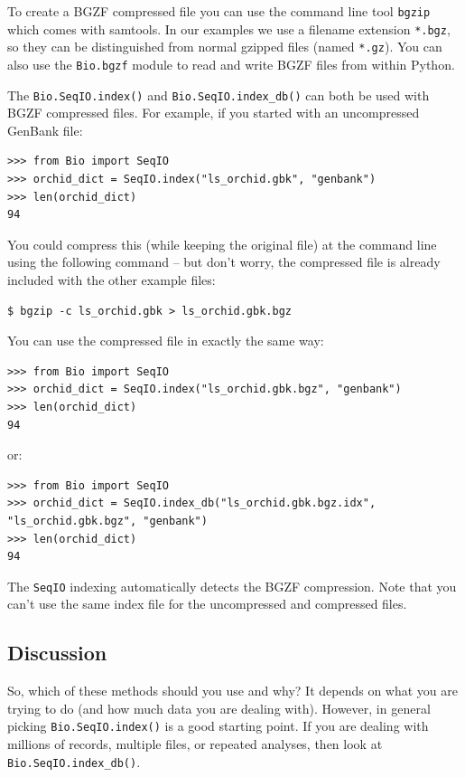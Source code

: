 \documentclass{report}
\begin{document}
To create a BGZF compressed file you can use the command line tool \verb|bgzip|
which comes with samtools. In our examples we use a filename extension
\verb|*.bgz|, so they can be distinguished from normal gzipped files (named
\verb|*.gz|). You can also use the \verb|Bio.bgzf| module to read and write
BGZF files from within Python.

The \verb|Bio.SeqIO.index()| and \verb|Bio.SeqIO.index_db()| can both be
used with BGZF compressed files. For example, if you started with an
uncompressed GenBank file:

\begin{verbatim}
>>> from Bio import SeqIO
>>> orchid_dict = SeqIO.index("ls_orchid.gbk", "genbank")
>>> len(orchid_dict)
94
\end{verbatim}

You could compress this (while keeping the original file) at the command
line using the following command -- but don't worry, the compressed file
is already included with the other example files:

\begin{verbatim}
$ bgzip -c ls_orchid.gbk > ls_orchid.gbk.bgz
\end{verbatim}

You can use the compressed file in exactly the same way:

\begin{verbatim}
>>> from Bio import SeqIO
>>> orchid_dict = SeqIO.index("ls_orchid.gbk.bgz", "genbank")
>>> len(orchid_dict)
94
\end{verbatim}

\noindent
or:

\begin{verbatim}
>>> from Bio import SeqIO
>>> orchid_dict = SeqIO.index_db("ls_orchid.gbk.bgz.idx", "ls_orchid.gbk.bgz", "genbank")
>>> len(orchid_dict)
94
\end{verbatim}

The \verb|SeqIO| indexing automatically detects the BGZF compression. Note
that you can't use the same index file for the uncompressed and compressed files.

\subsection{Discussion}
\label{sec:SeqIO-indexing-discussion}

So, which of these methods should you use and why? It depends on what you are
trying to do (and how much data you are dealing with). However, in general
picking \verb|Bio.SeqIO.index()| is a good starting point. If you are dealing
with millions of records, multiple files, or repeated analyses, then look at
\verb|Bio.SeqIO.index_db()|.
\end{document}
